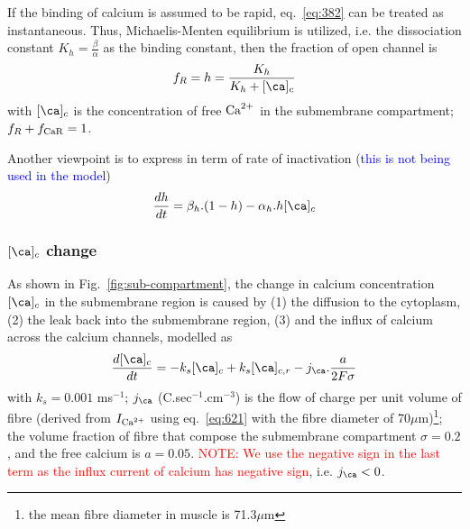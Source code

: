 \begin{framed}
  If the binding of calcium is assumed to be rapid, eq.~\eqref{eq:382}
  can be treated as instantaneous.  Thus, Michaelis-Menten equilibrium
  is utilized, i.e. the dissociation constant $K_h=\frac{\beta}{\alpha}$
  as the binding constant, then the fraction of open channel
  is%
  \begin{equation}
    \label{eq:630}
    f_R = h = \frac{K_h}{K_h +  [\ca]_c} 
  \end{equation}
  with $[\ca]_c$ is the concentration of free ${\text{Ca}^{2+}}$ in the
  submembrane compartment; $f_R+f_{\ce{CaR}} = 1$.

  Another viewpoint is to express in term of rate of inactivation
  (\textcolor{blue}{this is not being used in the model})
  \begin{equation}
    \label{eq:383}
    \frac{dh}{dt} = \beta_h.(1-h) - \alpha_h . h [\ca]_c
  \end{equation}
\end{framed}



\subsubsection{$[\ca]_c$ change}


As shown in Fig.~\ref{fig:sub-compartment}, the change in calcium
concentration $[\ca]_c$ in the submembrane region is caused by (1)
the diffusion to the cytoplasm, (2) the leak back into the submembrane
region, (3) and the influx of calcium across the calcium channels,
modelled as
\begin{equation}
  \label{eq:629}
  \frac{d[\ca]_c}{dt} = -k_s[\ca]_c +k_s[\ca]_{c,r} - j_\ca .\frac{a}{2F\sigma}
\end{equation}
with $k_s = 0.001$ ms$^{-1}$; $j_\ca $ (C.sec$^{-1}$.cm$^{-3}$) is the
flow of charge per unit volume of fibre (derived from $I_{\text{Ca}^{2+}}$ using
eq.~\eqref{eq:621} with the fibre diameter of
70$\mu$m)\footnote{the mean fibre diameter in muscle is 71.3$\mu$m};
the volume fraction of fibre that compose the submembrane compartment
$\sigma=0.2$ , and the free calcium is $a=0.05$.
\textcolor{red}{NOTE: We use the negative sign in the last term as the
  influx current of calcium has negative sign}, i.e. $j_\ca < 0$.


